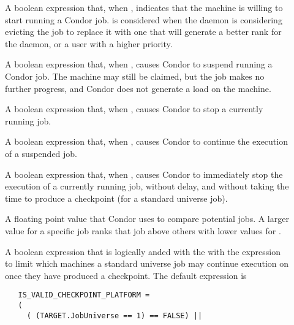 \begin{description}

\item[] \label{param:Start}  A boolean expression
  that, when , indicates that the machine is willing
  to start running a Condor job.
   is considered when the  daemon
  is considering evicting the job to replace it with one that will
  generate a better rank for the  daemon,
  or a user with a higher priority.

\item[] \label{param:Suspend}  A boolean expression
   that, when , causes Condor to suspend running
   a Condor job.
   The machine may still be claimed, but the job makes no further
   progress, and Condor does not generate a load on the machine.

\item[] \label{param:Preempt}   A boolean expression
   that, when , causes Condor to stop a currently
   running job.

\item[] \label{param:Continue}  A boolean expression
   that, when , causes Condor to continue the execution
   of a suspended job.

\item[] \label{param:Kill}  A boolean expression
   that, when , causes Condor to immediately stop the
   execution of a currently running job, without delay, and
   without taking the time to produce a checkpoint (for a standard
   universe job).

\item[] \label{param:Rank}  A floating point value
   that Condor uses to compare potential jobs.
   A larger value for a specific job ranks that job above
   others with lower values for .

\item[] \label{param:IsValidCheckpointPlatform} A boolean expression that is logically anded with the
   with the  expression to limit which machines a
   standard universe job may continue execution on once they have
   produced a checkpoint.
   The default expression is

   \footnotesize
   \begin{verbatim}
   IS_VALID_CHECKPOINT_PLATFORM =
   (
     ( (TARGET.JobUniverse == 1) == FALSE) ||
   

\end{verbatim}
\end{description}
